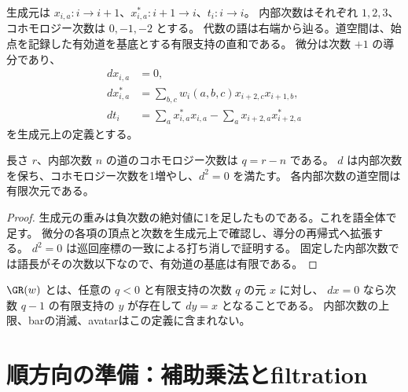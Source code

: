 \begin{definition}[有限支持のGinzburg道複体]\label{def:ginzburg}
\leanok
{}
生成元は $x_{i,a}:i\to i+1$、$x^*_{i,a}:i+1\to i$、$t_i:i\to i$。
内部次数はそれぞれ $1,2,3$、コホモロジー次数は $0,-1,-2$ とする。
代数の語は右端から辿る。道空間は、始点を記録した有効道を基底とする有限支持の直和である。
微分は次数 $+1$ の導分であり、
\[
\begin{split}
 d x_{i,a}&=0,\\
 d x^*_{i,a}&=\sum_{b,c}w_i(a,b,c)x_{i+2,c}x_{i+1,b},\\
 d t_i&=\sum_a x^*_{i,a}x_{i,a}-\sum_a x_{i+2,a}x^*_{i+2,a}
\end{split}
\]
を生成元上の定義とする。
\end{definition}

\begin{lemma}[次数と微分]\label{lem:ginzburg-grading}
\leanok
{}
長さ $r$、内部次数 $n$ の道のコホモロジー次数は $q=r-n$ である。
$d$ は内部次数を保ち、コホモロジー次数を1増やし、$d^2=0$ を満たす。
各内部次数の道空間は有限次元である。
\end{lemma}
\begin{proof}\leanok
生成元の重みは負次数の絶対値に1を足したものである。これを語全体で足す。
微分の各項の頂点と次数を生成元上で確認し、導分の再帰式へ拡張する。
$d^2=0$ は巡回座標の一致による打ち消しで証明する。
固定した内部次数では語長がその次数以下なので、有効道の基底は有限である。
\end{proof}

\begin{definition}\label{def:ginzburg-regular}
\leanok
{}
$\GR(w)$ とは、任意の $q<0$ と有限支持の次数 $q$ の元 $x$ に対し、
$dx=0$ なら次数 $q-1$ の有限支持の $y$ が存在して $dy=x$ となることである。
内部次数の上限、barの消滅、avatarはこの定義に含まれない。
\end{definition}

\section{順方向の準備：補助乗法とfiltration}

